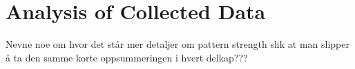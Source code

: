 \chapter{Analysis of Collected Data}\label{chap:analysis}

	Nevne noe om hvor det står mer detaljer om pattern strength slik at man slipper å ta den samme korte oppsummeringen i hvert delkap???

